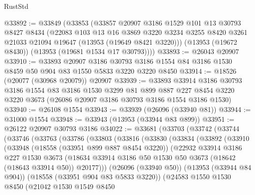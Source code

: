 \begin{lexlean}{RustStd}
\begin{coremodule}
@33892 := @33849
    (@33853
      (@33857
        @20907
        @3186
        @1529
        @101
        @13
        @30793
        @8427
        @8434
        (@22083
          @103
          @13
          @16
          @3869
          @3220
          @3234
          @3255
          @8420
          @3261
          @21033
          @21094
          @19647
          (@13953 (@19649 @8421 @3220)))
        (@13953 (@19672 @8430))
        (@13953 (@19681 @1534 @17 @30793))))
@33893 := @26043 @20907
@33910 := @33893
    @20907
    @3186
    @30793
    @3186
    @1554
    @84
    @3186
    @1530
    @8459
    @50
    @904
    @83
    @1550
    @5833
    @3220
    @3220
    @8450
@33914 := @18526 (@20077 (@30968 @20079)) @20907
@33939 := @33893
    @33914
    @3186
    @30793
    @3186
    @1554
    @83
    @3186
    @1530
    @3299
    @81
    @899
    @887
    @227
    @8454
    @3220
    @3220
    @3673
    (@26086 @20907 @3186 @30793 @3186 @1554 @3186 @1530)
@33940 := @26108 @1554
@33943 := @33939 (@26096 (@33940 @81))
@33944 := @31000 @1554
@33948 := @33943 (@13953 (@33944 @83 @899))
@33951 := @26122 @20907 @30793 @3186
@34022 := @33681
    (@33703
      (@33742
        (@33744
          (@33746
            (@33763
              (@33786
                (@33803
                  (@33816
                    (@33830
                      (@33834
                        (@33892
                          (@33910
                            (@33948
                              (@18558 (@33951 @899 @887 @8454 @3220))
                              (@22932
                                @33914
                                @3186
                                @227
                                @1530
                                @3673
                                (@18634
                                  @33914
                                  @3186
                                  @50
                                  @1530
                                  @50
                                  @3673
                                  (@18642 (@18643 @33914 @50))
                                  @20177)))
                            (@26096 (@33940 @50))
                            (@13953 (@33944 @84 @904))
                            (@18558 (@33951 @904 @83 @5833 @3220))
                            (@24583
                              @1550
                              @1530
                              @8450
                              (@21042
                                @1530
                                @1549
                                @8450

\end{coremodule}
\end{lexlean}
